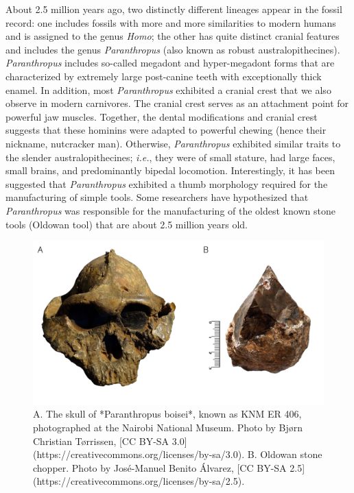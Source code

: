\documentclass[
]{book}
\begin{document}
About 2.5 million years ago, two distinctly different lineages appear in the fossil record: one includes fossils with more and more similarities to modern humans and is assigned to the genus \emph{Homo}; the other has quite distinct cranial features and includes the genus \emph{Paranthropus} (also known as robust australopithecines). \emph{Paranthropus} includes so-called megadont and hyper-megadont forms that are characterized by extremely large post-canine teeth with exceptionally thick enamel. In addition, most \emph{Paranthropus} exhibited a cranial crest that we also observe in modern carnivores. The cranial crest serves as an attachment point for powerful jaw muscles. Together, the dental modifications and cranial crest suggests that these hominins were adapted to powerful chewing (hence their nickname, nutcracker man). Otherwise, \emph{Paranthropus} exhibited similar traits to the slender australopithecines; \emph{i.e.}, they were of small stature, had large faces, small brains, and predominantly bipedal locomotion. Interestingly, it has been suggested that \emph{Paranthropus} exhibited a thumb morphology required for the manufacturing of simple tools. Some researchers have hypothesized that \emph{Paranthropus} was responsible for the manufacturing of the oldest known stone tools (Oldowan tool) that are about 2.5 million years old.

\begin{figure}
\includegraphics[width=1\linewidth]{images/paranthropus} \caption{A. The skull of *Paranthropus boisei*, known as KNM ER 406, photographed at the Nairobi National Museum. Photo by Bjørn Christian Tørrissen, [CC BY-SA 3.0](https://creativecommons.org/licenses/by-sa/3.0). B. Oldowan stone chopper. Photo by José-Manuel Benito Álvarez, [CC BY-SA 2.5](https://creativecommons.org/licenses/by-sa/2.5).}\label{fig:megadont}
\end{figure}
\end{document}
